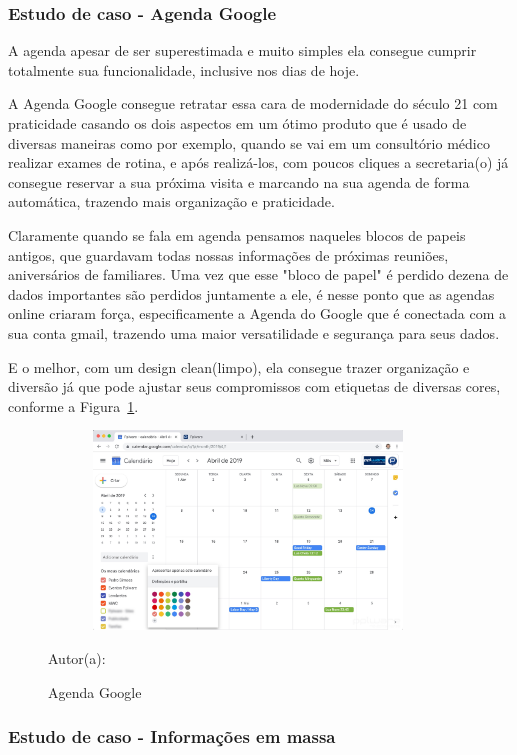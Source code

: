 \subsubsection{Estudo de caso - Agenda Google}

A agenda apesar de ser superestimada e muito simples ela consegue cumprir totalmente sua funcionalidade, inclusive nos dias de hoje. 

A Agenda Google consegue retratar essa cara de modernidade do século 21 com praticidade casando os dois aspectos em um ótimo produto que é usado de diversas maneiras como por exemplo, quando se vai em um consultório médico realizar exames de rotina, e após realizá-los, com poucos cliques a secretaria(o) já consegue reservar a sua próxima visita e marcando na sua agenda de forma automática, trazendo mais organização e praticidade.

Claramente quando se fala em agenda pensamos naqueles blocos de papeis antigos, que guardavam todas nossas informações de próximas reuniões, aniversários de familiares. Uma vez que esse "bloco de papel" é perdido dezena de dados importantes são perdidos juntamente a ele, é nesse ponto que as agendas online criaram força, especificamente a Agenda do Google que é conectada com a sua conta gmail, trazendo uma maior versatilidade e segurança para seus dados.

E o melhor, com um design clean(limpo), ela consegue trazer organização e diversão já que pode ajustar seus compromissos com etiquetas de diversas cores, conforme a Figura~\hypersetup{linkcolor=black}\ref{fig:agenda}.

\begin{figure}[!h]
	\centering
	\caption{Agenda Google}
	\label{fig:agenda}
	\includegraphics[width=400px, height=200px]{./images/agenda.jpg}
	\par {Autor(a): \cite{agenda}}
\end{figure}


\newpage

\subsubsection{Estudo de caso - Informações em massa}

